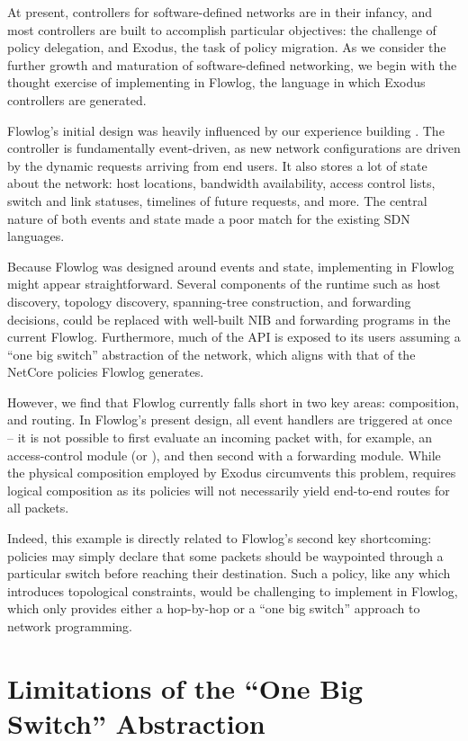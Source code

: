 At present, controllers for software-defined networks are in their infancy, and
most controllers are built to accomplish particular objectives: \sys the challenge of policy
delegation, and Exodus, the task of policy migration. As we consider the further
growth and maturation of software-defined networking, we begin with the thought exercise
of implementing \sys in Flowlog, the language in which Exodus controllers are generated.

Flowlog's initial design was heavily influenced by our experience building \sys.
The \sys controller is fundamentally event-driven, as new network configurations
are driven by the dynamic requests arriving from end users. It also stores a lot of state
about the network: host locations, bandwidth availability, access control lists, switch
and link statuses, timelines of future requests, and more. The central nature of both events
and state made \sys a poor match for the existing SDN languages.

Because Flowlog was designed around events and state, implementing \sys in Flowlog
might appear straightforward. Several components of the \sys runtime such as host
discovery, topology discovery, spanning-tree construction, and forwarding decisions,
could be replaced with well-built NIB and forwarding programs in the current Flowlog.
Furthermore, much of the \sys API is exposed to its users assuming a ``one big switch''
abstraction of the network, which aligns with that of the NetCore policies Flowlog generates.

However, we find that Flowlog currently falls short in two key areas: composition, and routing.
In Flowlog's present design, all event handlers are triggered at once -- it is not possible to
first evaluate an incoming packet with, for example, an access-control module (or \sys), and
then second with a forwarding module. While the physical composition employed by Exodus
circumvents this problem, \sys requires logical composition as its policies will not necessarily
yield end-to-end routes for all packets.

Indeed, this example is directly related to Flowlog's second key shortcoming: \sys policies may
simply declare that some packets should be waypointed through a particular switch before
reaching their destination. Such a policy, like any which introduces topological constraints,
would be challenging to implement in Flowlog, which only provides either a hop-by-hop or
a ``one big switch'' approach to network programming.

\section{Limitations of the ``One Big Switch'' Abstraction}
\label{sec:one-big-switch}

